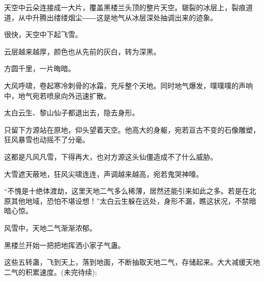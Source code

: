 \begin{this_body}
天空中云朵连接成一大片，覆盖黑楼兰头顶的整片天空。皲裂的冰层上，裂痕道道，从中升腾出缕缕烟尘――这是地气从冰层深处抽调出来的迹象。

很快，天空中下起飞雪。

云层越来越厚，颜色也从先前的灰白，转为深黑。

方圆千里，一片晦暗。

大风呼啸，卷起寒冷刺骨的冰霜，充斥整个天地。同时地气爆发，噗噗噗的声响中，地气宛若喷泉向外迅速扩散。

太白云生、黎山仙子都退出去，隐去身形。

只留下方源站在原地，仰头望着天空。他高大的身躯，宛若亘古不变的石像雕塑，狂风暴雪也动摇不了分毫。

这都是凡风凡雪，下得再大，也对方源这头仙僵造成不了什么威胁。

大雪遮天蔽地，狂风尖啸连连，声调越来越高，宛若鬼哭神嚎。

“不愧是十绝体渡劫，这里天地二气多么稀薄，居然还能引来如此之多。若是在北原其他地域，恐怕不堪设想！”太白云生躲在远处，身形不漏，瞧这状况，不禁暗暗心惊。

风雪中，天地二气渐渐浓郁。

黑楼兰开始一把把地挥洒小家子气蛊。

这些五转蛊，飞到天上，落到地面，不断抽取天地二气，存储起来。大大减缓天地二气的积累速度。(未完待续);

\end{this_body}

